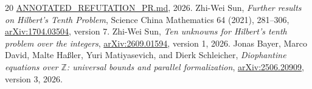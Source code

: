 \documentclass[11pt,letterpaper]{article}
\newcommand{\Z}{\mathbb Z}
\theoremstyle{definition}
\theoremstyle{remark}
\begin{document}
\begin{thebibliography}{20}
\href{https://github.com/VladimirReshetnikov/ProveIt/blob/2605669a532342f153b13eb6b4a0af4b54f5fa37/Computability/DiophantineConsistency/ANNOTATED_REFUTATION_PR.md}{ANNOTATED\_REFUTATION\_PR.md}, 2026.
 Zhi-Wei Sun, \emph{Further results on Hilbert's Tenth Problem},
Science China Mathematics 64 (2021), 281--306,
\href{https://arxiv.org/abs/1704.03504}{arXiv:1704.03504}, version 7.
 Zhi-Wei Sun, \emph{Ten unknowns for Hilbert's tenth problem over the integers},
\href{https://arxiv.org/abs/2609.01594}{arXiv:2609.01594}, version 1, 2026.
 Jonas Bayer, Marco David, Malte Ha\ss ler, Yuri Matiyasevich,
and Dierk Schleicher, \emph{Diophantine equations over $\Z$: universal bounds and parallel formalization},
\href{https://arxiv.org/abs/2506.20909}{arXiv:2506.20909}, version 3, 2026.
\end{thebibliography}
\end{document}
